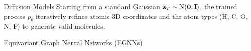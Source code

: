 \documentclass[final]{beamer}
\newlength{\colwidth}
\begin{document}
\begin{frame}[t]
\begin{columns}[t]
\begin{column}{\colwidth}
\begin{block}{Diffusion Models}
        Starting from a standard Gaussian \(\vb{z}_{T} \sim \operatorname{N}(\vb{0}, \mathbf{I})\), the trained process \(p_{\theta}\) iteratively refines atomic 3D coordinates and the atom types (H, C, O, N, F) to generate valid molecules.

        \vspace{0.1em}

        \begin{figure}
          \centering
          
          \label{fig:enter-label}
        \end{figure}
        \vspace{0.01em}

      \end{block}




      \begin{block}{Equivariant Graph Neural Networks (EGNNs)}


\end{block}
\end{column}
\end{columns}
\end{frame}
\end{document}
